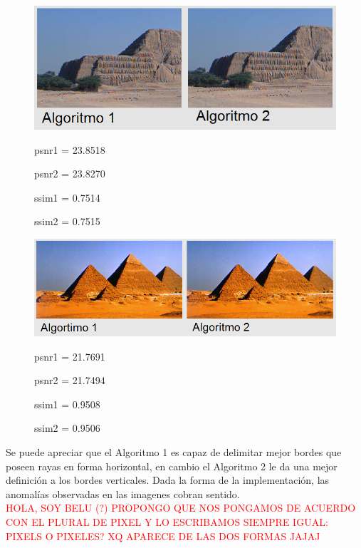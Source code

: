 \documentclass[a4paper]{article}
\begin{document}
\begin{figure}[h!]
	\caption{}
	\begin{center}
	\includegraphics[scale=0.06]{imagenes/Vecino/piramides3cmp}
	\label{Zebra}
	
	psnr1 =   23.8518

psnr2 =   23.8270

ssim1 =    0.7514

ssim2 =    0.7515
  \end{center}
\end{figure}

\begin{figure}[h!]
	\caption{}
	\begin{center}
	\includegraphics[scale=0.70]{imagenes/Vecino/piramides2cmp}
	\label{Zebra}
	
	psnr1 =   21.7691

psnr2 =   21.7494

ssim1 =    0.9508

ssim2 =    0.9506
  \end{center}
\end{figure}




Se puede apreciar que el Algoritmo 1 es capaz de delimitar mejor bordes que poseen rayas en forma horizontal, en cambio el Algoritmo 2 le da una mejor definici\'on a los bordes verticales. Dada la forma de la implementaci\'on, las anomal\'ias observadas en las imagenes cobran sentido.\\

\textcolor{red}{HOLA, SOY BELU (?) PROPONGO QUE NOS PONGAMOS DE ACUERDO CON EL PLURAL DE PIXEL Y LO ESCRIBAMOS SIEMPRE IGUAL: PIXELS O PIXELES? XQ APARECE DE LAS DOS FORMAS JAJAJ}
\end{document}
